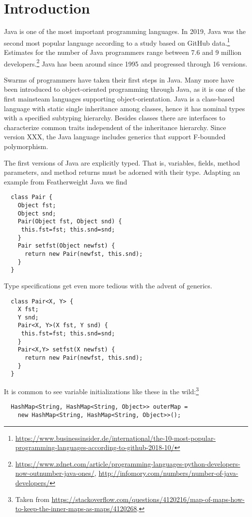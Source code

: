 \section{Introduction}
\label{sec:introduction}

Java is one of the most important programming languages. In 2019, Java
was the second most popular language according to a study
based on GitHub
data.\footnote{\url{https://www.businessinsider.de/international/the-10-most-popular-programming-languages-according-to-github-2018-10/}} Estimates
for the number of Java programmers range between 7.6 and 9 million
developers.\footnote{\url{https://www.zdnet.com/article/programming-languages-python-developers-now-outnumber-java-ones/},
\url{http://infomory.com/numbers/number-of-java-developers/}} Java
has been around since 1995 and progressed through 16 versions.

Swarms of programmers have taken their first steps in Java. Many more
have been introduced to object-oriented programming through Java, as
it is one of the first mainsteam languages supporting
object-orientation. Java is a class-based language with static single inheritance among
classes, hence it has nominal types with a specified subtyping
hierarchy. Besides classes there are interfaces to characterize common 
traits independent of the inheritance hierarchy. Since version XXX,
the Java language includes generics that support F-bounded
polymorphism.

The first versions of Java are explicitly typed. That is, 
variables, fields, method parameters, and method returns must be
adorned with their type. Adapting an example from Featherweight Java
\cite{DBLP:journals/toplas/IgarashiPW01} we find
\begin{lstlisting}
  class Pair {
    Object fst;
    Object snd;
    Pair(Object fst, Object snd) {
     this.fst=fst; this.snd=snd;
    }
    Pair setfst(Object newfst) {
      return new Pair(newfst, this.snd);
    }
  }
\end{lstlisting}
Type specifications get even more tedious
with the advent of generics.
\begin{lstlisting}
  class Pair<X, Y> {
    X fst;
    Y snd;
    Pair<X, Y>(X fst, Y snd) {
     this.fst=fst; this.snd=snd;
    }
    Pair<X,Y> setfst(X newfst) {
      return new Pair(newfst, this.snd);
    }
  }  
\end{lstlisting}
It is common to see variable initializations like
these in the wild:\footnote{Taken from
  \url{https://stackoverflow.com/questions/4120216/map-of-maps-how-to-keep-the-inner-maps-as-maps/4120268}.} 
\begin{lstlisting}
  HashMap<String, HashMap<String, Object>> outerMap =
    new HashMap<String, HashMap<String, Object>>();
\end{lstlisting}

